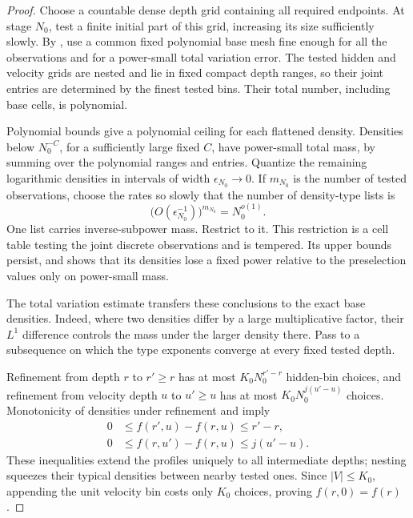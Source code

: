 \begin{proof}
Choose a countable dense depth grid containing all required
endpoints.  At stage \(N_0\), test a finite initial part of this
grid, increasing its size sufficiently slowly.
By , use a common fixed polynomial base mesh
fine enough for all the observations and for a power-small
total variation error.  The tested hidden and velocity grids
are nested and lie in fixed compact depth ranges, so their joint
entries are determined by the finest tested bins.  Their total
number, including base cells, is polynomial.

Polynomial bounds give a polynomial ceiling for each flattened
density.  Densities below \(N_0^{-C}\), for a sufficiently large
fixed \(C\), have power-small total mass, by summing over the
polynomial ranges and entries.  Quantize the remaining logarithmic
densities in intervals of width \(\epsilon_{N_0}\to0\).
If \(m_{N_0}\) is the number of tested observations, choose the
rates so slowly that the number of density-type lists is
\[
 \bigl(O(\epsilon_{N_0}^{-1})\bigr)^{m_{N_0}}=N_0^{o(1)}.
\]
One list carries inverse-subpower mass.  Restrict to it.
This restriction is a cell table testing the joint discrete
observations and is tempered.  Its upper bounds persist, and
 shows that its densities lose a
fixed power relative to the preselection values only on
power-small mass.

The total variation estimate transfers these conclusions to
the exact base densities.  Indeed, where two densities differ
by a large multiplicative factor, their \(L^1\) difference
controls the mass under the larger density there.
Pass to a subsequence on which the type exponents converge at
every fixed tested depth.

Refinement from depth \(r\) to \(r'\ge r\) has at most
\(K_0N_0^{r'-r}\) hidden-bin choices, and refinement from velocity
depth \(u\) to \(u'\ge u\) has at most
\(K_0N_0^{j(u'-u)}\) choices.  Monotonicity of densities under
refinement and  imply
\begin{align*}
 0&\le f(r',u)-f(r,u)\le r'-r,\\
 0&\le f(r,u')-f(r,u)\le j(u'-u).
\end{align*}
These inequalities extend the profiles uniquely to all
intermediate depths; nesting squeezes their typical densities
between nearby tested ones.  Since \(|V|\le K_0\), appending
the unit velocity bin costs only \(K_0\) choices, proving
\(f(r,0)=f(r)\).
\end{proof}


